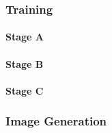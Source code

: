 \subsubsection{Training}

\paragraph*{Stage A}

\paragraph*{Stage B}

\paragraph*{Stage C}

\subsubsection{Image Generation}